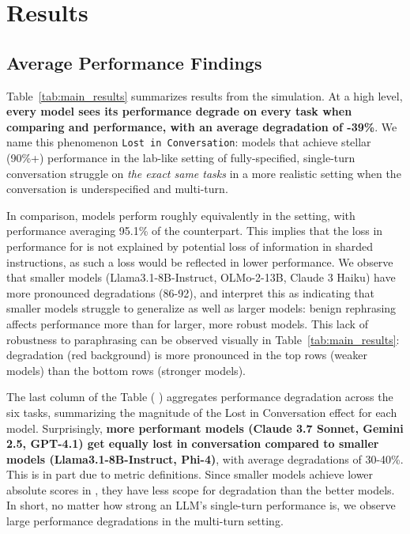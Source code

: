 \documentclass{article}
\begin{document}
\section{Results} \label{sec:results}



\subsection{Average Performance Findings} \label{sec:main_results}

Table~\ref{tab:main_results} summarizes results from the simulation. At a high level, \textbf{every model sees its performance degrade on every task when comparing \fullt and \shardedt performance, with an average degradation of -39\%}. We name this phenomenon \texttt{Lost in Conversation}: models that achieve stellar (90\%+) performance in the lab-like setting of fully-specified, single-turn conversation struggle on \textit{the exact same tasks} in a more realistic setting when the conversation is underspecified and multi-turn.

In comparison, models perform roughly equivalently in the \concatt setting, with \concatt performance averaging 95.1\% of the \fullt counterpart.
This implies that the loss in performance for \shardedt is not explained by potential loss of information in sharded instructions, as such a loss would be reflected in lower \concatt performance. We observe that smaller models (Llama3.1-8B-Instruct, OLMo-2-13B, Claude 3 Haiku) have more pronounced \concatt degradations (86-92), and interpret this as indicating that smaller models struggle to generalize as well as larger models: benign rephrasing affects performance more than for larger, more robust models. This lack of robustness to paraphrasing can be observed visually in Table~\ref{tab:main_results}: \concatt degradation (red background) is more pronounced in the top rows (weaker models) than the bottom rows (stronger models).

The last column of the Table (\raisebox{0.5ex}{\sharded} \raisebox{-0.5ex}{\LARGE{/}} \raisebox{-0.5ex}{\full}) aggregates performance degradation across the six tasks, summarizing the magnitude of the Lost in Conversation effect for each model.
Surprisingly, \textbf{more performant models (Claude 3.7 Sonnet, Gemini 2.5, GPT-4.1) get equally lost in conversation compared to smaller models (Llama3.1-8B-Instruct, Phi-4)}, with average degradations of 30-40\%. This is in part due to metric definitions. Since smaller models achieve lower absolute scores in \fullt, they have less scope for degradation than the better models. In short, no matter how strong an LLM's single-turn performance is, we observe large performance degradations in the multi-turn setting.
\end{document}
